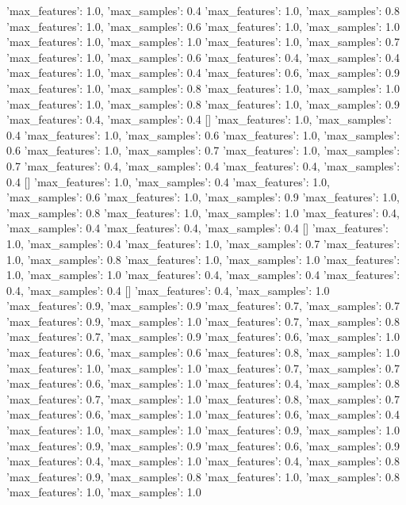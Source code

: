 {'max_features': 1.0, 'max_samples': 0.4}
{'max_features': 1.0, 'max_samples': 0.8}
{'max_features': 1.0, 'max_samples': 0.6}
{'max_features': 1.0, 'max_samples': 1.0}
{'max_features': 1.0, 'max_samples': 1.0}
{'max_features': 1.0, 'max_samples': 0.7}
{'max_features': 1.0, 'max_samples': 0.6}
{'max_features': 0.4, 'max_samples': 0.4}
{'max_features': 1.0, 'max_samples': 0.4}
{'max_features': 0.6, 'max_samples': 0.9}
{'max_features': 1.0, 'max_samples': 0.8}
{'max_features': 1.0, 'max_samples': 1.0}
{'max_features': 1.0, 'max_samples': 0.8}
{'max_features': 1.0, 'max_samples': 0.9}
{'max_features': 0.4, 'max_samples': 0.4}
[]
{'max_features': 1.0, 'max_samples': 0.4}
{'max_features': 1.0, 'max_samples': 0.6}
{'max_features': 1.0, 'max_samples': 0.6}
{'max_features': 1.0, 'max_samples': 0.7}
{'max_features': 1.0, 'max_samples': 0.7}
{'max_features': 0.4, 'max_samples': 0.4}
{'max_features': 0.4, 'max_samples': 0.4}
[]
{'max_features': 1.0, 'max_samples': 0.4}
{'max_features': 1.0, 'max_samples': 0.6}
{'max_features': 1.0, 'max_samples': 0.9}
{'max_features': 1.0, 'max_samples': 0.8}
{'max_features': 1.0, 'max_samples': 1.0}
{'max_features': 0.4, 'max_samples': 0.4}
{'max_features': 0.4, 'max_samples': 0.4}
[]
{'max_features': 1.0, 'max_samples': 0.4}
{'max_features': 1.0, 'max_samples': 0.7}
{'max_features': 1.0, 'max_samples': 0.8}
{'max_features': 1.0, 'max_samples': 1.0}
{'max_features': 1.0, 'max_samples': 1.0}
{'max_features': 0.4, 'max_samples': 0.4}
{'max_features': 0.4, 'max_samples': 0.4}
[]
{'max_features': 0.4, 'max_samples': 1.0}
{'max_features': 0.9, 'max_samples': 0.9}
{'max_features': 0.7, 'max_samples': 0.7}
{'max_features': 0.9, 'max_samples': 1.0}
{'max_features': 0.7, 'max_samples': 0.8}
{'max_features': 0.7, 'max_samples': 0.9}
{'max_features': 0.6, 'max_samples': 1.0}
{'max_features': 0.6, 'max_samples': 0.6}
{'max_features': 0.8, 'max_samples': 1.0}
{'max_features': 1.0, 'max_samples': 1.0}
{'max_features': 0.7, 'max_samples': 0.7}
{'max_features': 0.6, 'max_samples': 1.0}
{'max_features': 0.4, 'max_samples': 0.8}
{'max_features': 0.7, 'max_samples': 1.0}
{'max_features': 0.8, 'max_samples': 0.7}
{'max_features': 0.6, 'max_samples': 1.0}
{'max_features': 0.6, 'max_samples': 0.4}
{'max_features': 1.0, 'max_samples': 1.0}
{'max_features': 0.9, 'max_samples': 1.0}
{'max_features': 0.9, 'max_samples': 0.9}
{'max_features': 0.6, 'max_samples': 0.9}
{'max_features': 0.4, 'max_samples': 1.0}
{'max_features': 0.4, 'max_samples': 0.8}
{'max_features': 0.9, 'max_samples': 0.8}
{'max_features': 1.0, 'max_samples': 0.8}
{'max_features': 1.0, 'max_samples': 1.0}
